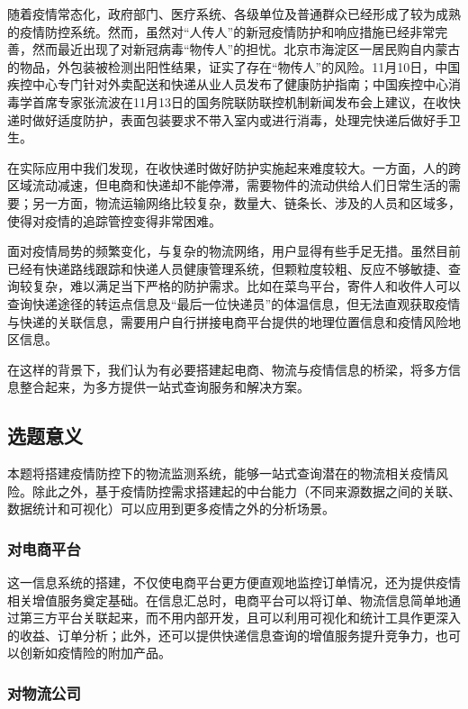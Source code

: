 \documentclass[12pt]{article}
\begin{document}
随着疫情常态化，政府部门、医疗系统、各级单位及普通群众已经形成了较为成熟的疫情防控系统。然而，虽然对“人传人”的新冠疫情防护和响应措施已经非常完善，然而最近出现了对新冠病毒“物传人”的担忧。北京市海淀区一居民购自内蒙古的物品，外包装被检测出阳性结果，证实了存在“物传人”的风险。11月10日，中国疾控中心专门针对外卖配送和快递从业人员发布了健康防护指南；中国疾控中心消毒学首席专家张流波在11月13日的国务院联防联控机制新闻发布会上建议，在收快递时做好适度防护，表面包装要求不带入室内或进行消毒，处理完快递后做好手卫生。\par 
在实际应用中我们发现，在收快递时做好防护实施起来难度较大。一方面，人的跨区域流动减速，但电商和快递却不能停滞，需要物件的流动供给人们日常生活的需要；另一方面，物流运输网络比较复杂，数量大、链条长、涉及的人员和区域多，使得对疫情的追踪管控变得非常困难。\par 
面对疫情局势的频繁变化，与复杂的物流网络，用户显得有些手足无措。虽然目前已经有快递路线跟踪和快递人员健康管理系统，但颗粒度较粗、反应不够敏捷、查询较复杂，难以满足当下严格的防护需求。比如在菜鸟平台，寄件人和收件人可以查询快递途径的转运点信息及“最后一位快递员”的体温信息，但无法直观获取疫情与快递的关联信息，需要用户自行拼接电商平台提供的地理位置信息和疫情风险地区信息。\par 
在这样的背景下，我们认为有必要搭建起电商、物流与疫情信息的桥梁，将多方信息整合起来，为多方提供一站式查询服务和解决方案。

\subsection{选题意义}

本题将搭建疫情防控下的物流监测系统，能够一站式查询潜在的物流相关疫情风险。除此之外，基于疫情防控需求搭建起的中台能力（不同来源数据之间的关联、数据统计和可视化）可以应用到更多疫情之外的分析场景。\par 

\subsubsection{对电商平台}

这一信息系统的搭建，不仅使电商平台更方便直观地监控订单情况，还为提供疫情相关增值服务奠定基础。在信息汇总时，电商平台可以将订单、物流信息简单地通过第三方平台关联起来，而不用内部开发，且可以利用可视化和统计工具作更深入的收益、订单分析；此外，还可以提供快递信息查询的增值服务提升竞争力，也可以创新如疫情险的附加产品。

\subsubsection{对物流公司}
\end{document}

